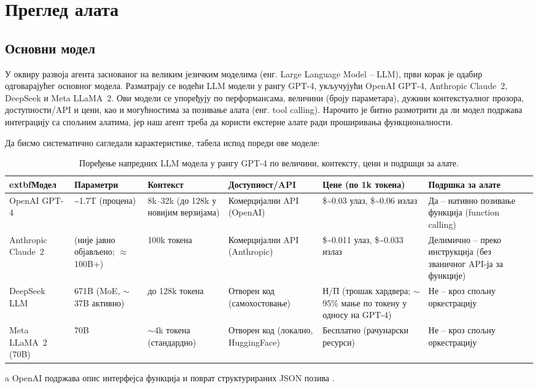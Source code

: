 \chapter{Преглед алата}
\label{sec:llm_agent}

\section{Основни модел}

У оквиру развоја агента заснованог на великим језичким моделима (енг. Large Language Model -- LLM), први корак је одабир одговарајућег основног модела. Разматрају се водећи LLM модели у рангу GPT-4, укључујући OpenAI GPT-4, Anthropic Claude~2, DeepSeek и Meta LLaMA~2. Ови модели се упоређују по перформансама, величини (броју параметара), дужини контекстуалног прозора, доступности/API и цени, као и могућностима за позивање алата (енг. tool calling). Нарочито је битно размотрити да ли модел подржава интеграцију са спољним алатима, јер наш агент треба да користи екстерне алате ради проширивања функционалности.

Да бисмо систематично сагледали карактеристике, табела испод пореди ове моделе:

\begin{table}[h]
\centering
\footnotesize
\begin{threeparttable}
\begin{tabular}{|p{2.9cm}|p{2.6cm}|p{2.6cm}|p{3.1cm}|p{3.1cm}|p{3.0cm}|}
\hline
    extbf{Модел} & \textbf{Параметри} & \textbf{Контекст} & \textbf{Доступност/API} & \textbf{Цене (по 1k токена)} & \textbf{Подршка за алате} \\
\hline
OpenAI GPT-4 & \textasciitilde{}1.7T (процена) & 8k--32k (до 128k у новијим верзијама) & Комерцијални API (OpenAI) & \$\sim{}0.03 улаз, \$\sim{}0.06 излаз & Да -- нативно позивање функција (function calling)\tnote{a} \\
\hline
Anthropic Claude~2 & (није јавно објављено; \(\approx\)100B+) & 100k токена & Комерцијални API (Anthropic) & \$\sim{}0.011 улаз, \$\sim{}0.033 излаз & Делимично -- преко инструкција (без званичног API-ја за функције) \\
\hline
DeepSeek LLM & 671B (MoE, \(\sim\)37B активно) & до 128k токена & Отворен код (самохостовање) & Н/П (трошак хардвера; \(\sim\)95\% мање по токену у односу на GPT-4) & Не -- кроз спољну оркестрацију \\
\hline
Meta LLaMA~2 (70B) & 70B & \(\sim\)4k токена (стандардно) & Отворен код (локално, HuggingFace) & Бесплатно (рачунарски ресурси) & Не -- кроз спољну оркестрацију \\
\hline
\end{tabular}
\begin{tablenotes}
\item[a] OpenAI подржава опис интерфејса функција и поврат структурираних JSON позива \cite{openai_function_calling_2023}.
\end{tablenotes}
\end{threeparttable}
\caption{Поређење напредних LLM модела у рангу GPT-4 по величини, контексту, цени и подршци за алате.}
\label{tab:llm_comparison}
\end{table}


